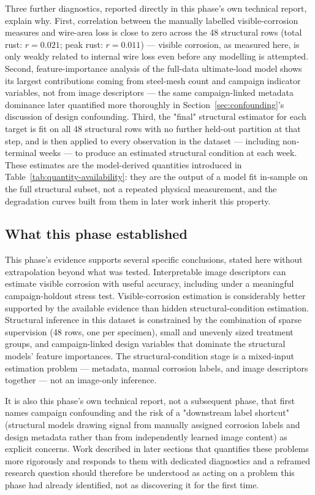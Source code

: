 Three further diagnostics, reported directly in this phase's own technical
report, explain why. First, correlation between the manually labelled
visible-corrosion measures and wire-area loss is close to zero across the
48 structural rows (total rust: $r=0.021$; peak rust: $r=0.011$) — visible
corrosion, as measured here, is only weakly related to internal wire loss
even before any modelling is attempted. Second, feature-importance analysis
of the full-data ultimate-load model shows its largest contributions coming
from steel-mesh count and campaign indicator variables, not from image
descriptors — the same campaign-linked metadata dominance later quantified
more thoroughly in Section~\ref{sec:confounding}'s discussion of design
confounding. Third, the "final" structural estimator for each target is fit
on all 48 structural rows with no further held-out partition at that step,
and is then applied to every observation in the dataset — including
non-terminal weeks — to produce an estimated structural condition at each
week. These estimates are the model-derived quantities introduced in
Table~\ref{tab:quantity-availability}: they are the output of a model fit
in-sample on the full structural subset, not a repeated physical
measurement, and the degradation curves built from them in later work
inherit this property.

\subsection{What this phase established}
\label{sec:phase3-synthesis}

This phase's evidence supports several specific conclusions, stated here
without extrapolation beyond what was tested. Interpretable image
descriptors can estimate visible corrosion with useful accuracy, including
under a meaningful campaign-holdout stress test. Visible-corrosion
estimation is considerably better supported by the available evidence than
hidden structural-condition estimation. Structural inference in this
dataset is constrained by the combination of sparse supervision (48 rows,
one per specimen), small and unevenly sized treatment groups, and
campaign-linked design variables that dominate the structural models'
feature importances. The structural-condition stage is a mixed-input
estimation problem — metadata, manual corrosion labels, and image
descriptors together — not an image-only inference.

It is also this phase's own technical report, not a subsequent phase, that
first names campaign confounding and the risk of a "downstream label
shortcut" (structural models drawing signal from manually assigned
corrosion labels and design metadata rather than from independently
learned image content) as explicit concerns. Work described in later
sections that quantifies these problems more rigorously and responds to
them with dedicated diagnostics and a reframed research question should
therefore be understood as acting on a problem this phase had already
identified, not as discovering it for the first time.

